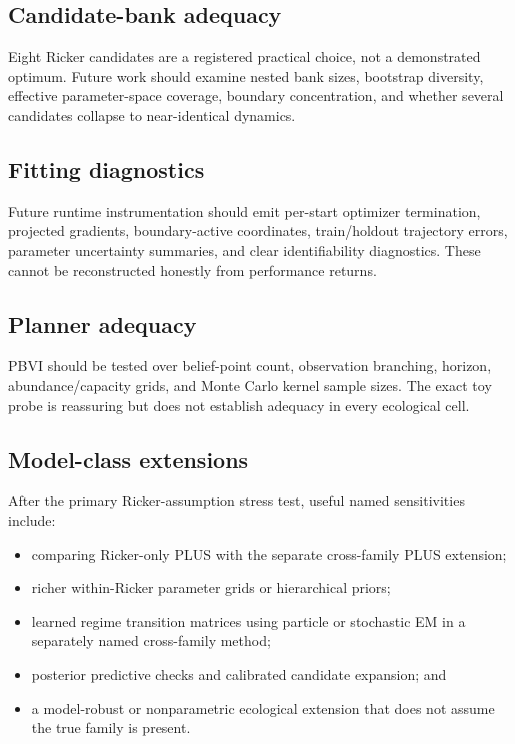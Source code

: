 \documentclass[11pt]{article}
\begin{document}
\subsection{Candidate-bank adequacy}

Eight Ricker candidates are a registered practical choice, not a demonstrated optimum. Future
work should examine nested bank sizes, bootstrap diversity, effective parameter-space coverage,
boundary concentration, and whether several candidates collapse to near-identical dynamics.

\subsection{Fitting diagnostics}

Future runtime instrumentation should emit per-start optimizer termination, projected gradients,
boundary-active coordinates, train/holdout trajectory errors, parameter uncertainty summaries, and
clear identifiability diagnostics. These cannot be reconstructed honestly from performance returns.

\subsection{Planner adequacy}

PBVI should be tested over belief-point count, observation branching, horizon, abundance/capacity
grids, and Monte Carlo kernel sample sizes. The exact toy probe is reassuring but does not establish
adequacy in every ecological cell.

\subsection{Model-class extensions}

After the primary Ricker-assumption stress test, useful named sensitivities include:

\begin{itemize}
  \item comparing Ricker-only PLUS with the separate cross-family PLUS extension;
  \item richer within-Ricker parameter grids or hierarchical priors;
  \item learned regime transition matrices using particle or stochastic EM in a separately named
  cross-family method;
  \item posterior predictive checks and calibrated candidate expansion; and
  \item a model-robust or nonparametric ecological extension that does not assume the true family is
  present.
\end{itemize}
\end{document}
